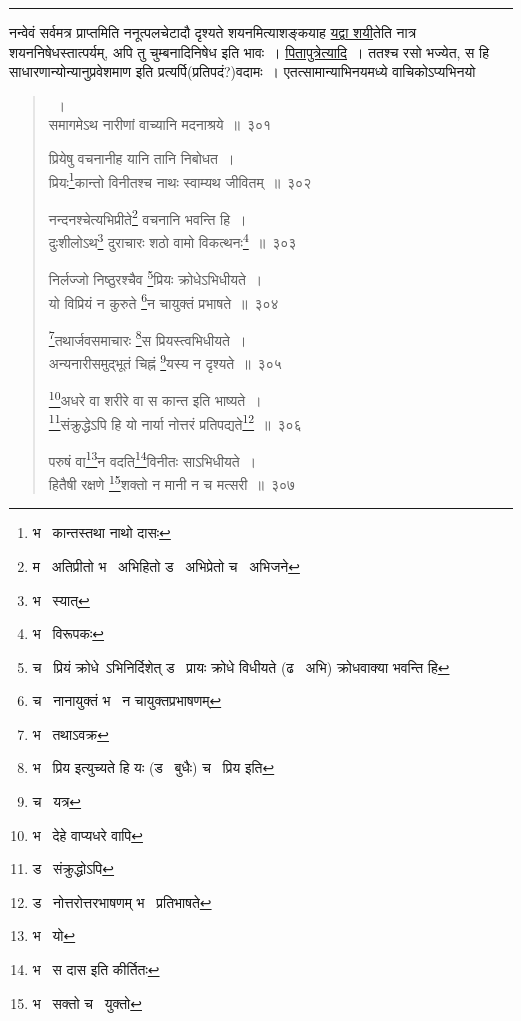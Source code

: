 \documentclass[11pt, openany]{book}
\begin{document}
\hrule

\vspace{2mm}
\begin{sloppypar}
नन्वेवं सर्वमत्र प्राप्तमिति ननूत्पलचेटादौ दृश्यते शयनमित्याशङ्कयाह \underline{यद्वा शयी}तेति नात्र शयननिषेधस्तात्पर्यम्, अपि तु चुम्बनादिनिषेध इति भावः~। \underline{पितापुत्रेत्यादि}~। ततश्च रसो भज्येत, स हि साधारणान्योन्यानुप्रवेशमाण इति प्रत्यर्पि(प्रतिपदं?)वदामः~। एतत्सामान्याभिनयमध्ये वाचिकोऽप्यभिनयो\textendash
\end{sloppypar}


\newpage
\lfoot{}

\begin{quote}
{\na [एवमन्तःपुरकृतः कार्यस्त्वभिनयो बुधैः]~। \\
समागमेऽथ नारीणां वाच्यानि मदनाश्रये~॥~३०१ 

प्रियेषु वचनानीह यानि तानि निबोधत~। \\
प्रियः\renewcommand{\thefootnote}{1}\footnote{भ \textendash\  कान्तस्तथा नाथो दासः}कान्तो विनीतश्च नाथः स्वाम्यथ जीवितम्~॥~३०२

नन्दनश्चेत्यभिप्रीते\renewcommand{\thefootnote}{2}\footnote{म \textendash\  अतिप्रीतो भ \textendash\  अभिहितो ड \textendash\  अभिप्रेतो च \textendash\  अभिजने} वचनानि भवन्ति हि~।\\
दुःशीलोऽथ\renewcommand{\thefootnote}{3}\footnote{भ \textendash\  स्यात्} दुराचारः शठो वामो विकत्थनः\renewcommand{\thefootnote}{4}\footnote{भ \textendash\  विरूपकः}~॥~३०३ 

निर्लज्जो निष्ठुरश्चैव \renewcommand{\thefootnote}{5}\footnote{च \textendash\  प्रियं क्रोधे\textendash\ ऽभिनिर्दिशेत् ड \textendash\  प्रायः क्रोधे विधीयते (ढ \textendash\  अभि) क्रोधवाक्या भवन्ति हि}प्रियः क्रोधेऽभिधीयते~। \\
यो विप्रियं न कुरुते \renewcommand{\thefootnote}{6}\footnote{च \textendash\  नानायुक्तं भ \textendash\  न चायुक्तप्रभाषणम्}न चायुक्तं प्रभाषते~॥~३०४ 

\renewcommand{\thefootnote}{7}\footnote{भ \textendash\  तथाऽवक्र}तथार्जवसमाचारः \renewcommand{\thefootnote}{8}\footnote{भ \textendash\  प्रिय इत्युच्यते हि यः (ड \textendash\  बुधैः) च \textendash\  प्रिय इति}स प्रियस्त्वभिधीयते~।\\
अन्यनारीसमुद्भूतं चिह्नं \renewcommand{\thefootnote}{9}\footnote{च \textendash\  यत्र}यस्य न दृश्यते~॥~३०५ 

\renewcommand{\thefootnote}{10}\footnote{भ \textendash\  देहे वाप्यधरे वापि}अधरे वा शरीरे वा स कान्त इति भाष्यते~।\\
\renewcommand{\thefootnote}{11}\footnote{ड \textendash\  संक्रुद्धोऽपि}संक्रुद्धेऽपि हि यो नार्या नोत्तरं प्रतिपद्यते\renewcommand{\thefootnote}{12}\footnote{ड \textendash\  नोत्तरोत्तरभाषणम् भ \textendash\  प्रतिभाषते}~॥~३०६ 

परुषं वा\renewcommand{\thefootnote}{13}\footnote{भ \textendash\  यो}न वदति\renewcommand{\thefootnote}{14}\footnote{भ \textendash\  स दास इति कीर्तितः}विनीतः साऽभिधीयते~।\\
हितैषी रक्षणे \renewcommand{\thefootnote}{15}\footnote{भ \textendash\  सक्तो च \textendash\  युक्तो}शक्तो न मानी न च मत्सरी~॥~३०७}
\end{quote}
\end{document}
